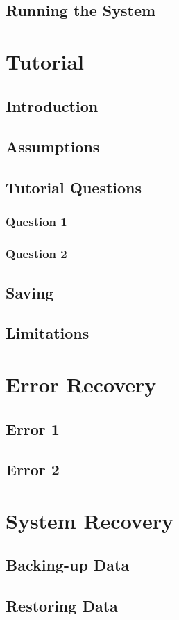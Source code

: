 \subsection{Running the System}

\section{Tutorial}

\subsection{Introduction}

\subsection{Assumptions}

\subsection{Tutorial Questions}

\subsubsection{Question 1}

\subsubsection{Question 2}

\subsection{Saving}

\subsection{Limitations}

\section{Error Recovery}

\subsection{Error 1}

\subsection{Error 2}

\section{System Recovery}

\subsection{Backing-up Data}

\subsection{Restoring Data}
